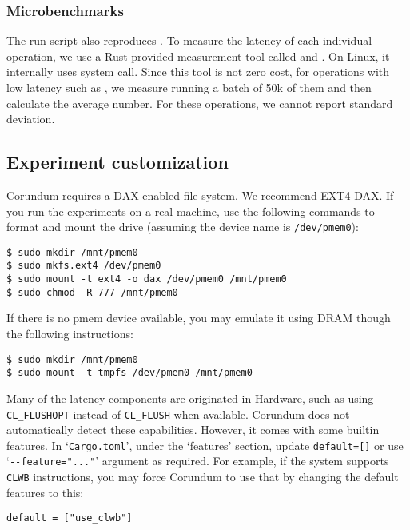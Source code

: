 {\subsubsection{Microbenchmarks}
The run script also reproduces . To measure the latency of each individual operation, we use a Rust provided measurement tool called  and . On Linux, it internally uses  system call. Since this tool is not zero cost, for operations with low latency such as , we measure running a batch of 50k of them and then calculate the average number. For these operations, we cannot report standard deviation.

\subsection{Experiment customization}
\label{sec:custom}

Corundum requires a DAX-enabled file system. We recommend EXT4-DAX. If you run the experiments on a real machine, use the following commands to format and mount the drive (assuming the device name is \verb+/dev/pmem0+):

\begin{verbatim}
$ sudo mkdir /mnt/pmem0
$ sudo mkfs.ext4 /dev/pmem0
$ sudo mount -t ext4 -o dax /dev/pmem0 /mnt/pmem0
$ sudo chmod -R 777 /mnt/pmem0
\end{verbatim}

If there is no pmem device available, you may emulate it using DRAM though the following instructions:

\begin{verbatim}
$ sudo mkdir /mnt/pmem0
$ sudo mount -t tmpfs /dev/pmem0 /mnt/pmem0
\end{verbatim}

Many of the latency components are originated in Hardware, such as using \verb+CL_FLUSHOPT+ instead of \verb+CL_FLUSH+ when available. Corundum does not automatically detect these capabilities. However, it comes with some builtin features. In `\verb+Cargo.toml+', under the `features' section, update \verb+default=[]+ or use `\verb+--feature="..."+' argument as required. For example, if the system supports \verb+CLWB+ instructions, you may force Corundum to use that by changing the default features to this:

\begin{center}
  \verb+default = ["use_clwb"]+
\end{center}

}
